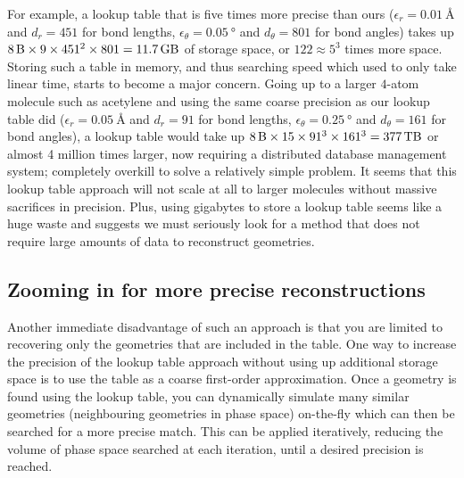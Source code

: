 For example, a lookup table that is five times more precise than ours ($\epsilon_r = \SI{0.01}{\angstrom}$ and $d_r = 451$ for bond lengths, $\epsilon_\theta = \SI{0.05}{\degree}$ and $d_\theta = 801$ for bond angles) takes up $\SI{8}{\byte} \times 9 \times 451^2 \times 801 = \SI{11.7}{\giga\byte}$ of storage space, or $122 \approx 5^3$ times more space. Storing such a table in memory, and thus searching speed which used to only take linear time, starts to become a major concern. Going up to a larger $4$-atom molecule such as acetylene and using the same coarse precision as our lookup table did ($\epsilon_r = \SI{0.05}{\angstrom}$ and $d_r = 91$ for bond lengths, $\epsilon_\theta = \SI{0.25}{\degree}$ and $d_\theta = 161$ for bond angles), a lookup table would take up $\SI{8}{\byte} \times 15 \times 91^3 \times 161^3 = \SI{377}{\tera\byte}$ or almost 4 million times larger, now requiring a distributed database management system; completely overkill to solve a relatively simple problem. It seems that this lookup table approach will not scale at all to larger molecules without massive sacrifices in precision. Plus, using gigabytes to store a lookup table seems like a huge waste and suggests we must seriously look for a method that does not require large amounts of data to reconstruct geometries.

\subsection{Zooming in for more precise reconstructions}

Another immediate disadvantage of such an approach is that you are limited to recovering only the geometries that are included in the table. One way to increase the precision of the lookup table approach without using up additional storage space is to use the table as a coarse first-order approximation. Once a geometry is found using the lookup table, you can dynamically simulate many similar geometries (neighbouring geometries in phase space) on-the-fly which can then be searched for a more precise match. This can be applied iteratively, reducing the volume of phase space searched at each iteration, until a desired precision is reached.

